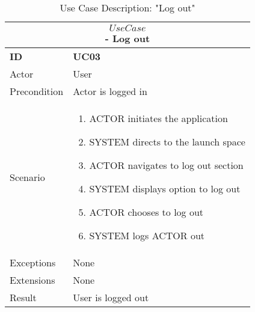 \begin{center}
    \vspace{5mm}
    \begin{table}[H]
        \begin{tabular}{ |p{2cm}||p{11cm}| }
            \hline
            \multicolumn{2}{|c|}{$$Use Case$$ - Log out} \\ \hline
            \textbf{ID} & \textbf{UC03} \\ \hline
            Actor & User \\ \hline
            Precondition & Actor is logged in \\ \hline
            Scenario &
            \begin{enumerate}
                \item ACTOR initiates the application
                \item SYSTEM directs to the launch space
                \item ACTOR navigates to log out section
                \item SYSTEM displays option to log out
                \item ACTOR chooses to log out
                \item SYSTEM logs ACTOR out
            \end{enumerate}
            \\ \hline 
            Exceptions & None \\ \hline
            Extensions & None \\ \hline
            Result & User is logged out \\ \hline
        \end{tabular}
        \caption{Use Case Description: "Log out"}
    \end{table}
    

\end{center}
